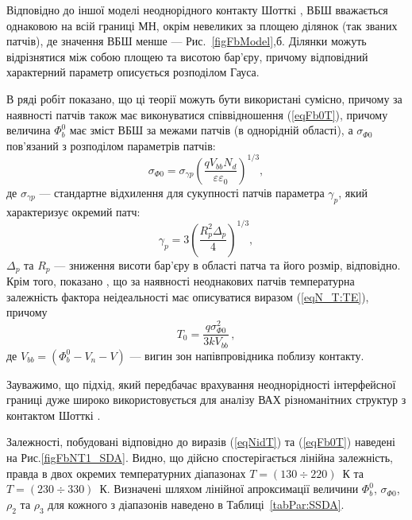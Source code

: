 Відповідно до іншої моделі неоднорідного контакту Шотткі \cite{Sullivan,Tung:PhysRev,Tung:MSE,Tung:ApplPhysRev}, ВБШ вважається однаковою на всій границі МН,
окрім невеликих за площею ділянок (так званих патчів), де значення ВБШ менше --- Рис.~\ref{figFbModel},б.
Ділянки можуть відрізнятися між собою площею та висотою бар'єру, причому відповідний характерний параметр описується розподілом Гауса.

В ряді робіт \cite{Iucolano2007JAP, Iucolano2007APL} показано, що ці теорії можуть бути використані сумісно,
причому за наявності патчів також має виконуватися співвідношення (\ref{eqFb0T}),
причому величина $\Phi_b^0$ має зміст ВБШ за межами патчів (в однорідній області),
а $\sigma_{\Phi0}$ пов'язаний з розподілом параметрів патчів:
\begin{equation}\label{eqGigFSigG}
  \sigma_{\Phi0}=\sigma_{\gamma p}\left(\frac{qV_{bb}N_d}{\varepsilon\varepsilon_0}\right)^{1/3},
\end{equation}
де
$\sigma_{\gamma p}$ --- стандартне відхилення для сукупності патчів параметра $\gamma_p$, який
характеризує окремий патч:
\begin{equation}\label{eqGammaP}
  \gamma_p=3\left(\frac{R_p^2\Delta_p}{4}\right)^{1/3},
\end{equation}
$\Delta_p$ та $R_p$ --- зниження висоти бар'єру в області патча та його розмір, відповідно.
Крім того, показано \cite{Sullivan,Tung:PhysRev,Iucolano2007JAP, Iucolano2007APL}, що за наявності неоднакових патчів
температурна залежність фактора неідеальності має описуватися виразом (\ref{eqN_T:TE}), причому
\begin{equation} \label{eqN_T0}
T_0=\frac{q\sigma_{\Phi0}^2}{3kV_{bb}}\,,
\end{equation}
де
$V_{bb}=(\Phi_b^0-V_n-V)$ --- вигин зон напівпровідника поблизу контакту.

Зауважимо, що підхід, який передбачає  врахування неоднорідності
інтерфейсної границі дуже широко використовується  для аналізу ВАХ різноманітних структур з контактом Шотткі
\cite{Soylu,GELCZUK2014,Mohan,JYOTHI2015,DURMUS2014,KHURE2015,OZAVCI2013,Cetin2005,Karatas:2006NIMA,Sarpatwari,
Tascioglu2010,Yildirim2010,Mamor,Iucolano2007JAP,Iucolano2007APL,Li2016}.

Залежності, побудовані відповідно до виразів (\ref{eqNidT}) та (\ref{eqFb0T}) наведені на Рис.\ref{figFbNT1_SDA}.
Видно, що дійсно спостерігається лінійна залежність,
правда в двох окремих температурних діапазонах $T=(130\div220)$~К та $T=(230\div330)$~К.
Визначені шляхом лінійної апроксимації величини $\Phi_{b}^0$, $\sigma_{\Phi0}$, $\rho_2$ та $\rho_3$ для кожного з діапазонів
наведено в Таблиці~\ref{tabPar:SSDA}.

